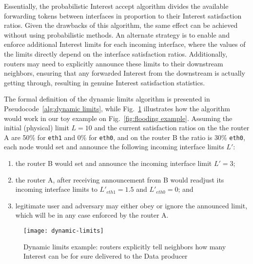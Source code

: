 

Essentially, the probabilistic Interest accept algorithm divides the available forwarding tokens between interfaces in proportion to their Interest satisfaction ratios.
Given the drawbacks of this algorithm, the same effect can be achieved without using probabilistic methods. An alternate strategy is to enable and enforce additional Interest limits for each incoming interface, where the values of the limits directly depend on the interface satisfaction ratios.
Additionally, routers may need to explicitly announce these limits to their downstream neighbors, ensuring that any forwarded Interest from the downstream is actually getting through, resulting in genuine Interest satisfaction statistics.

The formal definition of the dynamic limits algorithm is presented in Pseudocode~\ref{alg:dynamic limits}, while Fig.~\ref{fig:dynamic limits example} illustrates how the algorithm would work in our toy example on Fig.~\ref{fig:flooding example}.
Assuming the initial (physical) limit $L=10$ and the current satisfaction ratios on the the router A are 50\% for \texttt{eth1} and 0\% for \texttt{eth0}, and on the router B the ratio is 30\%  \texttt{eth0}, each node would set and announce the following  incoming interface limits $L'$: 
\begin{enumerate}
\item the router B would set and announce the incoming interface limit $L'=3$;
\item the router A, after receiving announcement from B would readjust its incoming interface limits to $L'_{eth1} = 1.5$ and $L'_{eth0} = 0$; and
\item legitimate user and adversary may either obey or ignore the announced limit, which will be in any case enforced by the router A.
\end{enumerate}


\begin{figure}[htbp]
  \centering
  \texttt{[image: dynamic-limits]}
  \caption{Dynamic limits example: routers explicitly tell neighbors how many Interest can be for sure delivered to the Data producer}
  \label{fig:dynamic limits example}
\end{figure}



